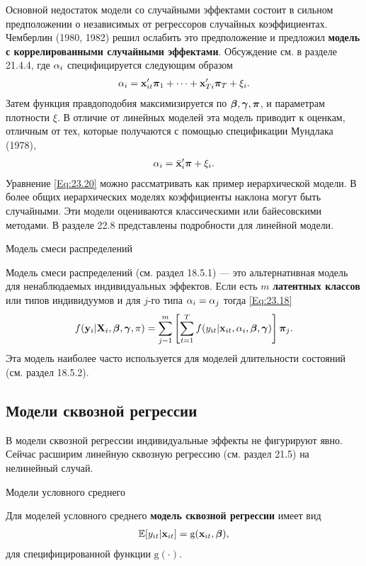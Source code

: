 Основной недостаток модели со случайными эффектами состоит в сильном предположении о независимых от регрессоров случайных коэффициентах.  Чемберлин (1980, 1982) решил ослабить это предположение и предложил \textbf{модель с коррелированными случайными эффектами}. Обсуждение см. в разделе 21.4.4, где $\alpha_i$ специфицируется следующим образом
\begin{align}
\alpha_i=\mathbf{x}'_{it} \bm\pi_1+ \dots + \mathbf{x}'_{Ti}\bm\pi_T+\xi_i.
\label{Eq:23.20}
\end{align}
Затем функция правдоподобия максимизируется по $\bm{\beta}, \bm\gamma, \bm\pi$, и параметрам плотности $\xi$. В отличие от линейных моделей эта модель  приводит к оценкам, отличным от тех, которые получаются с помощью спецификации Мундлака (1978), 
\begin{align}
\alpha_i=\bar{\mathbf{x}}'_i\bm\pi+\xi_i.
\label{Eq:23.21}
\end{align}
Уравнение \ref{Eq:23.20} можно рассматривать как пример иерархической модели. В более общих иерархических моделях коэффициенты наклона могут быть случайными. Эти модели оцениваются классическими или байесовскими методами. В разделе 22.8 представлены подробности для линейной  модели.

{\centering Модель смеси распределений \\} 

Модель смеси распределений (см. раздел 18.5.1) --- это альтернативная модель для ненаблюдаемых индивидуальных эффектов. Если есть $m$ \textbf{латентных классов} или типов индивидуумов и для $j$-го типа $\alpha_i=\alpha_j$ тогда \ref{Eq:23.18}
\begin{align}
f(\mathbf{y}_i|\mathbf{X}_i, \bm{\beta}, \bm\gamma, \pi) = \sum^m_{j=1} \left[\sum^T_{t=1}f(y_{it}|\mathbf{x}_{it}, \alpha_i, \bm{\beta}, \bm\gamma) \right] \bm\pi_j.
\nonumber
\end{align}
Эта модель наиболее часто используется для моделей длительности состояний (см. раздел 18.5.2).

\subsection{Модели сквозной регрессии}

В модели сквозной регрессии индивидуальные эффекты не фигурируют явно. Сейчас расширим линейную сквозную регрессию (см. раздел 21.5) на нелинейный случай.

{\centering Модели условного среднего \\}

Для моделей условного среднего \textbf{модель сквозной регрессии} имеет вид
\begin{align}
\mathbb{E}[y_{it}|\mathbf{x}_{it}]=\mathrm g(\mathbf{x}_{it}, \bm{\beta}),
\label{Eq:23.22}
\end{align}
для специфицированной функции $\mathrm g(\cdot)$.

